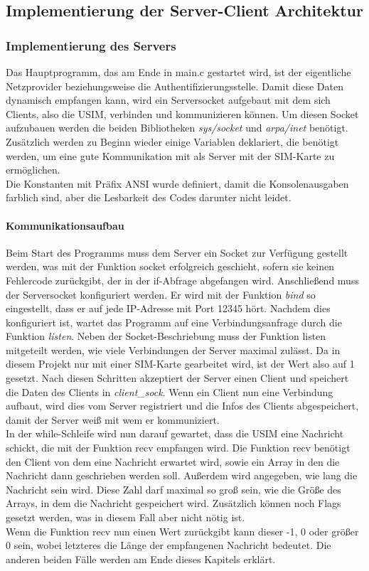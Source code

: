 \subsection{Implementierung der Server-Client Architektur}
\label{server-client-architektur}
	\subsubsection{Implementierung des Servers}
    	\label{subsec:impl_server}
	Das Hauptprogramm, das am Ende in main.c gestartet wird, ist der eigentliche Netzprovider beziehungsweise
	die Authentifizierungsstelle. Damit diese Daten dynamisch empfangen kann, wird ein Serversocket aufgebaut
	mit dem sich Clients, also die USIM, verbinden und kommunizieren können. Um diesen Socket aufzubauen werden
	die beiden Bibliotheken \emph{sys/socket} und \emph{arpa/inet} benötigt. Zusätzlich werden zu Beginn wieder
	einige Variablen deklariert, die benötigt werden, um eine gute Kommunikation mit als Server mit der SIM-Karte
	zu ermöglichen. \\
	Die Konstanten mit Präfix ANSI wurde definiert, damit die Konsolenausgaben farblich sind, aber die Lesbarkeit des
	Codes darunter nicht leidet.
	
		\paragraph{Kommunikationsaufbau}
		Beim Start des Programms muss dem Server ein Socket zur Verfügung gestellt werden, was mit der Funktion
		socket erfolgreich geschieht, sofern sie keinen Fehlercode zurückgibt, der in der if-Abfrage abgefangen wird.
		Anschließend muss	der Serversocket konfiguriert werden. Er wird mit der Funktion \emph{bind} so eingestellt, dass er
		auf jede IP-Adresse mit Port 12345 hört. Nachdem dies konfiguriert ist, wartet das Programm auf eine Verbindungsanfrage
		durch die Funktion \emph{listen}. Neben der Socket-Beschriebung muss der Funktion listen mitgeteilt werden, wie viele Verbindungen
		der Server maximal zulässt. Da in diesem Projekt nur mit einer SIM-Karte gearbeitet wird, ist der Wert also auf 1 gesetzt.
		Nach diesen Schritten akzeptiert der Server einen Client und speichert die Daten des Clients in \emph{client\_sock}.
		Wenn ein Client nun eine Verbindung aufbaut, wird dies vom Server registriert und die Infos des Clients abgespeichert,
		damit der Server weiß mit wem er kommuniziert. \\
		In der while-Schleife wird nun darauf gewartet, dass die USIM eine Nachricht schickt, die mit der Funktion recv empfangen
		wird. Die Funktion recv benötigt den Client von dem eine Nachricht erwartet wird, sowie ein Array in den die Nachricht dann
		geschrieben werden soll. Außerdem wird angegeben, wie lang die Nachricht sein wird. Diese Zahl darf maximal
		so groß sein, wie die Größe des Arrays, in dem die Nachricht gespeichert wird. Zusätzlich können noch Flags
		gesetzt werden, was in diesem Fall aber nicht nötig ist. \\
		Wenn die Funktion recv nun einen Wert zurückgibt kann dieser -1, 0 oder größer 0 sein, wobei letzteres die
		Länge der empfangenen Nachricht bedeutet. Die anderen beiden Fälle werden am Ende dieses Kapitels erklärt.
		

